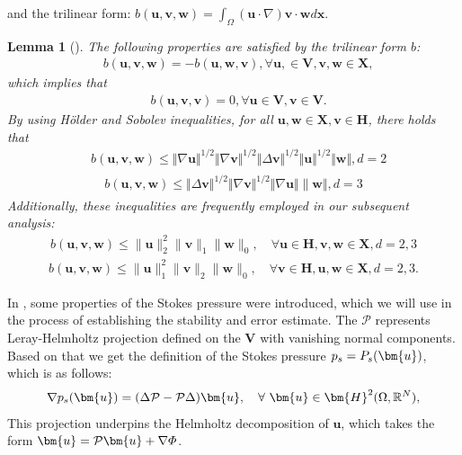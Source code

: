 \documentclass[10pt]{article}
\newtheorem{lemma}{Lemma}[section]
\begin{document}
 and the trilinear form:
$b(\bm{u,v,w})=\int_\Omega(\bm{u}\cdot\nabla)\bm{v}\cdot\bm{w}d\bm{x}$. 
\begin{lemma}[\cite{He2009}]\label{2.1'}
	The following properties are satisfied by the trilinear form $b$:
	\begin{align}
		&b(\bm{u,v,w})=-b(\bm{u,w,v}), { \forall \bm{u,}\in 	\bm{V},\bm{v,w}\in 	\bm{X},}
	\end{align}
	which implies that 
	\begin{align}\label{2.2}
		&	b(\bm{u,v,v})=0, { \forall \bm{u}\in 	\bm{V},\bm{v}\in 	\bm{V}}.
	\end{align}
	By using H\"{o}lder and Sobolev inequalities, for all {  $\bm{u, w} \in\bm{X}, \bm{v}\in \bm{H}$},   there holds that \cite{R1983}
	\begin{align}\label{2.3}
		& b(\bm{u,v,w})\leqslant \Vert\nabla\bm { u}\Vert^{1/2}\Vert \nabla\bm{v} \Vert^{1/2}\Vert\Delta\bm { v} \Vert_{}^{1/2}\Vert\bm {u} \Vert^{1/2}\Vert\bm {w} \Vert,  d=2
	\end{align}  
	\begin{align}\label{2.4}
		b(\bm{u,v,w})\leqslant \Vert\Delta\bm{ v} \Vert_{}^{1/2}\Vert\nabla\bm{v} \Vert^{1/2}\Vert\nabla\bm {u}\Vert\|\bm {w} \Vert,  d=3
	\end{align}
	Additionally, these inequalities are frequently employed in our subsequent analysis\cite{R1983}:
	\begin{align} \label{2.5}
		b(\bm{u, v, w}) \leq \|\bm{u}\|_2^2\|\bm{v}\|_1\|\bm{w}\|_0, \quad{ \forall \bm{u}\in \bm{H}, \bm{v,w} \in\bm{X}}, d=2,3
	\end{align}
	\begin{align}\label{2.6}
		b(\bm{u, v, w}) \leq \|\bm{u}\|_1^2\|\bm{v}\|_2\|\bm{w}\|_0, \quad{ \forall \bm{v}\in \bm{H},  \bm{u,w} \in\bm{X}},d=2,3.
	\end{align}
\end{lemma}
	In \cite{J2007}, some properties of the Stokes pressure were introduced, which we will use in the process of establishing the stability and error estimate. The $\mathcal{P}$  represents Leray-Helmholtz projection  defined on the $\bm{V}$ with vanishing normal components. Based on that we get the definition of the Stokes pressure $\mathnormal{p}_s = P_s(\bm{u})$, which is as follows:
	\begin{align}
		\nabla\mathnormal{p}_s(\bm{u}) =(\Delta \mathcal{P}-\mathcal{P}\Delta) \bm{u},\quad \forall\ \bm{u} \in \bm{H}^2(\Omega, \mathbb{R}^N),
	\end{align}
	This projection underpins the Helmholtz decomposition of $\bm{u}$, which takes the form $\mathnormal{\bm{u}}=\mathcal{P}\bm{u}+\nabla\varPhi$.
\end{document}
